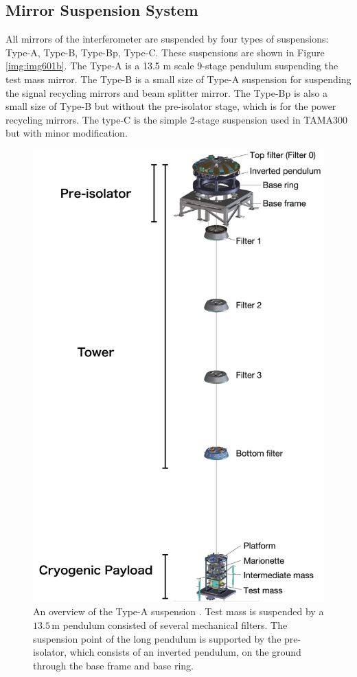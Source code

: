 \subsection{Mirror Suspension System}
All mirrors of the interferometer are suspended by four types of suspensions: Type-A, Type-B, Type-Bp, Type-C. These suspensions are shown in Figure \ref{img:img601b}. The Type-A is a 13.5 m scale 9-stage pendulum suspending the test mass mirror. The Type-B is a small size of Type-A suspension for suspending the signal recycling mirrors and beam splitter mirror. The Type-Bp is also a small size of Type-B but without the pre-isolator stage, which is for the power recycling mirrors. The type-C is the simple 2-stage suspension used in TAMA300 but with minor modification.
\begin{figure}[p]
  \begin{center}   
    \includegraphics[width=13cm]{./img_chap6/img604.png}
    \caption{An overview of the Type-A suspension \cite{Okutomi2019development}. Test mass is suspended by a $13.5\,\mathrm{m}$ pendulum consisted of several mechanical filters. The suspension point of the long pendulum is supported by the pre-isolator, which consists of an inverted pendulum, on the ground through the base frame and base ring.}\label{img:img604}
  \end{center}
\end{figure}

